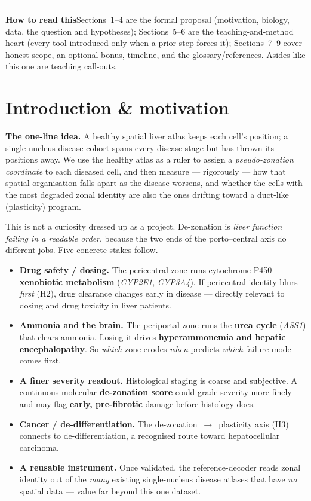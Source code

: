 \documentclass[11pt]{article}
\newcommand{\aside}[2]{\par\medskip\noindent\textcolor{teal0}{\rule{2pt}{\baselineskip}}\quad\textbf{\textcolor{teal0}{#1}}\quad #2\par\medskip}
\newcommand{\gene}[1]{\textit{#1}}
\begin{document}
\tableofcontents
\bigskip

\aside{How to read this}{Sections~1--4 are the formal proposal (motivation, biology, data, the
question and hypotheses); Sections~5--6 are the teaching-and-method heart (every tool introduced only
when a prior step forces it); Sections~7--9 cover honest scope, an optional bonus, timeline, and the
glossary/references. Asides like this one are teaching call-outs.}

\clearpage
\section{Introduction \& motivation}

\textbf{The one-line idea.} A healthy spatial liver atlas keeps each cell's position; a single-nucleus
disease cohort spans every disease stage but has thrown its positions away. We use the healthy atlas
as a ruler to assign a \emph{pseudo-zonation coordinate} to each diseased cell, and then measure ---
rigorously --- how that spatial organisation falls apart as the disease worsens, and whether the cells
with the most degraded zonal identity are also the ones drifting toward a duct-like (plasticity)
program.

This is not a curiosity dressed up as a project. De-zonation is \emph{liver function failing in a
readable order}, because the two ends of the porto--central axis do different jobs. Five concrete
stakes follow.

\begin{itemize}[leftmargin=1.4em]
\item \textbf{Drug safety / dosing.} The pericentral zone runs cytochrome-P450 \textbf{xenobiotic
metabolism} (\gene{CYP2E1}, \gene{CYP3A4}). If pericentral identity blurs \emph{first} (H2), drug
clearance changes early in disease --- directly relevant to dosing and drug toxicity in liver patients.
\item \textbf{Ammonia and the brain.} The periportal zone runs the \textbf{urea cycle} (\gene{ASS1})
that clears ammonia. Losing it drives \textbf{hyperammonemia and hepatic encephalopathy}. So
\emph{which} zone erodes \emph{when} predicts \emph{which} failure mode comes first.
\item \textbf{A finer severity readout.} Histological staging is coarse and subjective. A continuous
molecular \textbf{de-zonation score} could grade severity more finely and may flag \textbf{early,
pre-fibrotic} damage before histology does.
\item \textbf{Cancer / de-differentiation.} The de-zonation~$\to$~plasticity axis (H3) connects to
de-differentiation, a recognised route toward hepatocellular carcinoma.
\item \textbf{A reusable instrument.} Once validated, the reference-decoder reads zonal identity out
of the \emph{many} existing single-nucleus disease atlases that have \emph{no} spatial data --- value
far beyond this one dataset.
\end{itemize}
\end{document}
